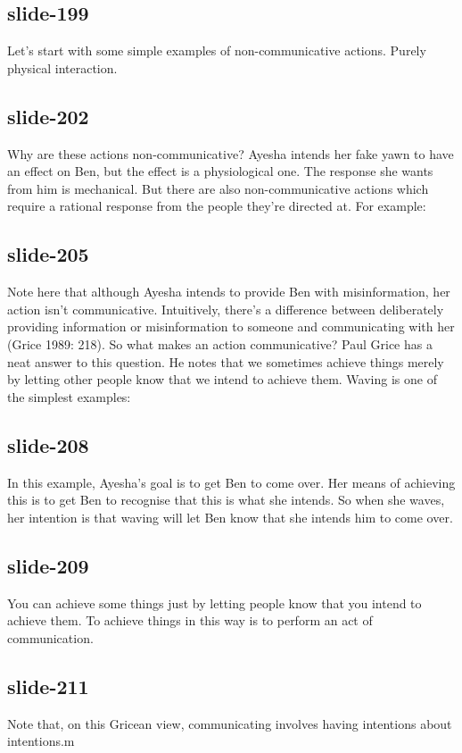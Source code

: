 \documentclass[12pt,\papersize]{extarticle}
\begin{document}
 
\subsection{slide-199}
Let’s start with some simple examples of non-communicative actions.
Purely physical interaction.
 
 
\subsection{slide-202}
Why are these actions non-communicative? Ayesha intends her fake yawn to have an effect on Ben, but the effect is a physiological one. The response she wants from him is mechanical.
But there are also non-communicative actions which require a rational response from the people they’re directed at. For example:
 
 
\subsection{slide-205}
Note here that although Ayesha intends to provide Ben with misinformation, her action isn’t communicative.
Intuitively, there’s a difference between deliberately providing information or misinformation to someone and communicating with her (Grice 1989: 218).
So what makes an action communicative?
Paul Grice has a neat answer to this question.
He notes that we sometimes achieve things merely by letting other people know that we intend to achieve them.
Waving is one of the simplest examples:
 
 
\subsection{slide-208}
In this example, Ayesha’s goal is to get Ben to come over. Her means of achieving this is to get Ben to recognise that this is what she intends. So when she waves, her intention is that waving will let Ben know that she intends him to come over.
 
 
\subsection{slide-209}
You can achieve some things just by letting people know that you intend to achieve them. To achieve things in this way is to perform an act of communication.
 
 
\subsection{slide-211}
Note that, on this Gricean view, communicating involves having intentions about intentions.m
 
\end{document}
